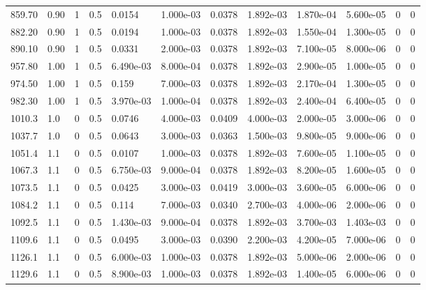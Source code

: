 \documentclass[preview]{standalone}
\begin{document}
{{{\begin{tabular}{L{1.2cm}C{1.2cm} C{0.3cm}C{0.5cm} C{1.4cm}C{1.4cm} C{1.4cm}C{1.4cm} C{1.6cm}C{1.6cm} C{1.6cm}C{1.6cm}}
  859.70  &  0.90  & 1     & 0.5 &  0.0154  & 1.000e-03  &  0.0378&   1.892e-03& 1.870e-04 & 5.600e-05   &  0 & 0  \\ 
  882.20  &  0.90  & 1     & 0.5 &  0.0194  & 1.000e-03  &  0.0378&   1.892e-03& 1.550e-04 & 1.300e-05   &  0 & 0  \\ 
  890.10  &  0.90  & 1     & 0.5 &  0.0331  & 2.000e-03  &  0.0378&   1.892e-03& 7.100e-05 & 8.000e-06   &  0 & 0  \\ 
  957.80  &  1.00  & 1     & 0.5 &  6.490e-03  & 8.000e-04  &  0.0378&   1.892e-03& 2.900e-05 & 1.000e-05   &  0 & 0  \\ 
  974.50  &  1.00  & 1     & 0.5 &  0.159  & 7.000e-03  &  0.0378&   1.892e-03& 2.170e-04 & 1.300e-05   &  0 & 0  \\ 
  982.30  &  1.00  & 1     & 0.5 &  3.970e-03  & 1.000e-04  &  0.0378&   1.892e-03& 2.400e-04 & 6.400e-05   &  0 & 0  \\ 
  1010.3  &   1.0  & 0     & 0.5 &  0.0746  & 4.000e-03  &  0.0409&   4.000e-03& 2.000e-05 & 3.000e-06   &  0 & 0  \\ 
  1037.7  &   1.0  & 0     & 0.5 &  0.0643  & 3.000e-03  &  0.0363&   1.500e-03& 9.800e-05 & 9.000e-06   &  0 & 0  \\ 
  1051.4  &   1.1  & 0     & 0.5 &  0.0107  & 1.000e-03  &  0.0378&   1.892e-03& 7.600e-05 & 1.100e-05   &  0 & 0  \\ 
  1067.3  &   1.1  & 0     & 0.5 &  6.750e-03  & 9.000e-04  &  0.0378&   1.892e-03& 8.200e-05 & 1.600e-05   &  0 & 0  \\ 
  1073.5  &   1.1  & 0     & 0.5 &  0.0425  & 3.000e-03  &  0.0419&   3.000e-03& 3.600e-05 & 6.000e-06   &  0 & 0  \\ 
  1084.2  &   1.1  & 0     & 0.5 &  0.114  & 7.000e-03  &  0.0340&   2.700e-03& 4.000e-06 & 2.000e-06   &  0 & 0  \\ 
  1092.5  &   1.1  & 0     & 0.5 &  1.430e-03  & 9.000e-04  &  0.0378&   1.892e-03& 3.700e-03 & 1.403e-03   &  0 & 0  \\ 
  1109.6  &   1.1  & 0     & 0.5 &  0.0495  & 3.000e-03  &  0.0390&   2.200e-03& 4.200e-05 & 7.000e-06   &  0 & 0  \\ 
  1126.1  &   1.1  & 0     & 0.5 &  6.000e-03  & 1.000e-03  &  0.0378&   1.892e-03& 5.000e-06 & 2.000e-06   &  0 & 0  \\ 
  1129.6  &   1.1  & 0     & 0.5 &  8.900e-03  & 1.000e-03  &  0.0378&   1.892e-03& 1.400e-05 & 6.000e-06   &  0 & 0  \\ 
\hline 
\end{tabular} 

}}}
\end{document}
